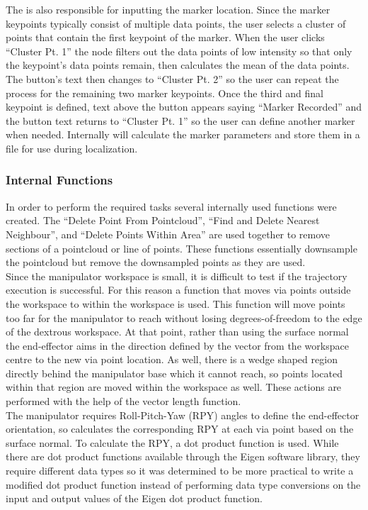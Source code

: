 The  is also responsible for inputting the marker location. Since the marker keypoints typically consist of multiple data points, the user selects a cluster of points that contain the first keypoint of the marker. When the user clicks ``Cluster Pt. 1''  the node filters out the data points of low intensity so that only the keypoint's data points remain, then calculates the mean of the data points. The button's text then changes to ``Cluster Pt. 2'' so the user can repeat the process for the remaining two marker keypoints. Once the third and final keypoint is defined, text above the button appears saying ``Marker Recorded'' and the button text returns to ``Cluster Pt. 1'' so the user can define another marker when needed. Internally  will calculate the marker parameters and store them in a file for use during localization.\\
\subsubsection{Internal Functions}
In order to perform the required tasks several internally used functions were created. The ``Delete Point From Pointcloud'', ``Find and Delete Nearest Neighbour'', and ``Delete Points Within Area'' are used together to remove sections of a pointcloud or line of points. These functions essentially downsample the pointcloud but remove the downsampled points as they are used.\\

Since the manipulator workspace is small, it is difficult to test if the trajectory execution is successful. For this reason a function that moves via points outside the workspace to within the workspace is used. This function will move points too far for the manipulator to reach without losing degrees-of-freedom to the edge of the dextrous workspace. At that point, rather than using the surface normal the end-effector aims in the direction defined by the vector from the workspace centre to the new via point location. As well, there is a wedge shaped region directly behind the manipulator base which it cannot reach, so points located within that region are moved within the workspace as well. These actions are performed with the help of the vector length function.\\

The manipulator requires Roll-Pitch-Yaw (RPY) angles to define the end-effector orientation, so  calculates the corresponding RPY at each via point based on the surface normal. To calculate the RPY, a dot product function is used. While there are dot product functions available through the Eigen software library, they require different data types so it was determined to be more practical to write a modified dot product function instead of performing data type conversions on the input and output values of the Eigen dot product function.\\


